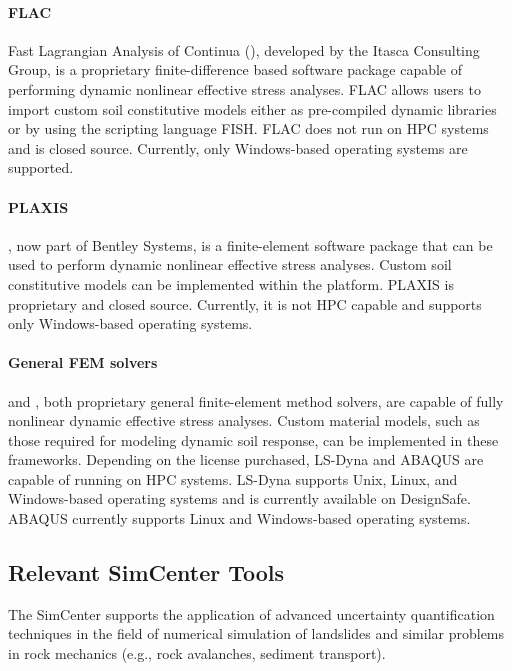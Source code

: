 \paragraph{FLAC}
Fast Lagrangian Analysis of Continua (), developed by the Itasca Consulting Group, is a proprietary finite-difference based software package capable of performing dynamic nonlinear effective stress analyses. FLAC allows users to import custom soil constitutive models either as pre-compiled dynamic libraries or by using the scripting language FISH. FLAC does not run on HPC systems and is closed source. Currently, only Windows-based operating systems are supported.

\paragraph{PLAXIS}
, now part of Bentley Systems, is a finite-element software package that can be used to perform dynamic nonlinear effective stress analyses. Custom soil constitutive models can be implemented within the platform. PLAXIS is proprietary and closed source. Currently, it is not HPC capable and supports only Windows-based operating systems.

\paragraph{General FEM solvers}
 and , both proprietary general finite-element method solvers, are capable of fully nonlinear dynamic effective stress analyses. Custom material models, such as those required for modeling dynamic soil response, can be implemented in these frameworks. Depending on the license purchased, LS-Dyna and ABAQUS are capable of running on HPC systems. LS-Dyna supports Unix, Linux, and Windows-based operating systems and is currently available on DesignSafe. ABAQUS currently supports Linux and Windows-based operating systems.

\subsection{Relevant SimCenter Tools}

The SimCenter supports the application of advanced uncertainty quantification techniques in the field of numerical simulation of landslides and similar problems in rock mechanics (e.g., rock avalanches, sediment transport).

